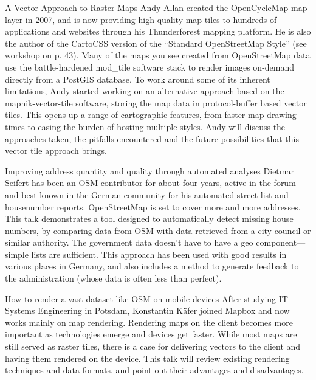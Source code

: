%
{A Vector Approach to Raster Maps}%
{Andy Allan created the OpenCycleMap map layer in 2007, and is now providing high-quality map tiles to hundreds of applications and websites through his Thunderforest mapping platform. He is also the author of the CartoCSS version of the ``Standard OpenStreetMap Style'' (see workshop on p. 43).}%
{Many of the maps you see created from OpenStreetMap data use the battle-hardened mod\_tile software stack to render images on-demand directly from a PostGIS database. To work around some of its inherent limitations, Andy started working on an alternative approach based on the mapnik-vector-tile software, storing the map data in protocol-buffer based vector tiles. This opens up a range of cartographic features, from faster map drawing times to easing the burden of hosting multiple styles. Andy will discuss the approaches taken, the pitfalls encountered and the future possibilities that this vector tile approach brings.}


%
{Improving address quantity and quality through automated analyses}%
{Dietmar Seifert has been an OSM contributor for about four years, active in the forum and best known in the German  community for his automated street list and housenumber reports.}%
{OpenStreetMap is set to cover more and more addresses. This talk demonstrates a tool designed to automatically detect missing house numbers, by comparing data from OSM with data retrieved from a city council or similar authority. The government data doesn't have to have a geo component---simple lists are sufficient. This approach has been used with good results in various places in Germany, and also includes a method to generate feedback to the administration (whose data is often less than perfect).}

%
{How to render a vast dataset like OSM on mobile devices}%
{After studying IT Systems Engineering in Potsdam, Konstantin Käfer joined Mapbox and now works mainly on map rendering.}%
{Rendering maps on the client becomes more important as technologies emerge and devices get faster. While most maps are still served as raster tiles, there is a case for delivering vectors to the client and having them rendered on the device. This talk will review existing rendering techniques and data formats, and point out their advantages and disadvantages.}

